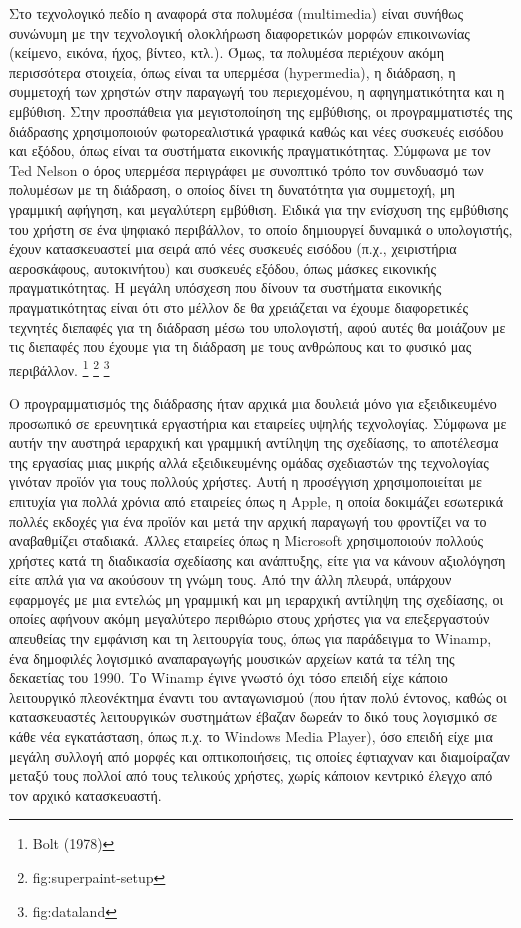 \documentclass[
]{article}
\begin{document}
Στο τεχνολογικό πεδίο η αναφορά στα πολυμέσα (multimedia) είναι συνήθως
συνώνυμη με την τεχνολογική ολοκλήρωση διαφορετικών μορφών επικοινωνίας
(κείμενο, εικόνα, ήχος, βίντεο, κτλ.). Όμως, τα πολυμέσα περιέχουν ακόμη
περισσότερα στοιχεία, όπως είναι τα υπερμέσα (hypermedia), η διάδραση, η
συμμετοχή των χρηστών στην παραγωγή του περιεχομένου, η αφηγηματικότητα
και η εμβύθιση. Στην προσπάθεια για μεγιστοποίηση της εμβύθισης, οι
προγραμματιστές της διάδρασης χρησιμοποιούν φωτορεαλιστικά γραφικά καθώς
και νέες συσκευές εισόδου και εξόδου, όπως είναι τα συστήματα εικονικής
πραγματικότητας. Σύμφωνα με τον Ted Nelson ο όρος υπερμέσα περιγράφει με
συνοπτικό τρόπο τον συνδυασμό των πολυμέσων με τη διάδραση, ο οποίος
δίνει τη δυνατότητα για συμμετοχή, μη γραμμική αφήγηση, και μεγαλύτερη
εμβύθιση. Ειδικά για την ενίσχυση της εμβύθισης του χρήστη σε ένα
ψηφιακό περιβάλλον, το οποίο δημιουργεί δυναμικά ο υπολογιστής, έχουν
κατασκευαστεί μια σειρά από νέες συσκευές εισόδου (π.χ., χειριστήρια
αεροσκάφους, αυτοκινήτου) και συσκευές εξόδου, όπως μάσκες εικονικής
πραγματικότητας. Η μεγάλη υπόσχεση που δίνουν τα συστήματα εικονικής
πραγματικότητας είναι ότι στο μέλλον δε θα χρειάζεται να έχουμε
διαφορετικές τεχνητές διεπαφές για τη διάδραση μέσω του υπολογιστή, αφού
αυτές θα μοιάζουν με τις διεπαφές που έχουμε για τη διάδραση με τους
ανθρώπους και το φυσικό μας περιβάλλον. \footnote{Bolt (1978)}
\footnote{fig:superpaint-setup} \footnote{fig:dataland}

Ο προγραμματισμός της διάδρασης ήταν αρχικά μια δουλειά μόνο για
εξειδικευμένο προσωπικό σε ερευνητικά εργαστήρια και εταιρείες υψηλής
τεχνολογίας. Σύμφωνα με αυτήν την αυστηρά ιεραρχική και γραμμική
αντίληψη της σχεδίασης, το αποτέλεσμα της εργασίας μιας μικρής αλλά
εξειδικευμένης ομάδας σχεδιαστών της τεχνολογίας γινόταν προϊόν για τους
πολλούς χρήστες. Αυτή η προσέγγιση χρησιμοποιείται με επιτυχία για πολλά
χρόνια από εταιρείες όπως η Apple, η οποία δοκιμάζει εσωτερικά πολλές
εκδοχές για ένα προϊόν και μετά την αρχική παραγωγή του φροντίζει να το
αναβαθμίζει σταδιακά. Άλλες εταιρείες όπως η Microsoft χρησιμοποιούν
πολλούς χρήστες κατά τη διαδικασία σχεδίασης και ανάπτυξης, είτε για να
κάνουν αξιολόγηση είτε απλά για να ακούσουν τη γνώμη τους. Από την άλλη
πλευρά, υπάρχουν εφαρμογές με μια εντελώς μη γραμμική και μη ιεραρχική
αντίληψη της σχεδίασης, οι οποίες αφήνουν ακόμη μεγαλύτερο περιθώριο
στους χρήστες για να επεξεργαστούν απευθείας την εμφάνιση και τη
λειτουργία τους, όπως για παράδειγμα το Winamp, ένα δημοφιλές λογισμικό
αναπαραγωγής μουσικών αρχείων κατά τα τέλη της δεκαετίας του 1990. Το
Winamp έγινε γνωστό όχι τόσο επειδή είχε κάποιο λειτουργικό πλεονέκτημα
έναντι του ανταγωνισμού (που ήταν πολύ έντονος, καθώς οι κατασκευαστές
λειτουργικών συστημάτων έβαζαν δωρεάν το δικό τους λογισμικό σε κάθε νέα
εγκατάσταση, όπως π.χ. το Windows Media Player), όσο επειδή είχε μια
μεγάλη συλλογή από μορφές και οπτικοποιήσεις, τις οποίες έφτιαχναν και
διαμοίραζαν μεταξύ τους πολλοί από τους τελικούς χρήστες, χωρίς κάποιον
κεντρικό έλεγχο από τον αρχικό κατασκευαστή.
\end{document}
